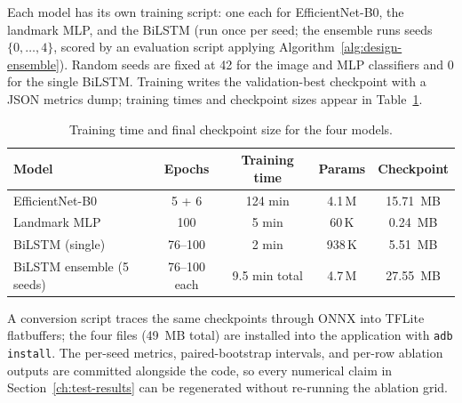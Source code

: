 Each model has its own training script: one each for EfficientNet-B0,
the landmark MLP, and the BiLSTM (run once per seed; the ensemble
runs seeds $\{0, \dots, 4\}$, scored by an evaluation script applying
Algorithm~\ref{alg:design-ensemble}). Random seeds are fixed at 42
for the image and MLP classifiers and 0 for the single BiLSTM.
Training writes the validation-best checkpoint with a JSON metrics
dump; training times and checkpoint sizes appear in
Table~\ref{tab:impl-training-summary}.

\begin{table}[!ht]
\centering
\caption{Training time and final checkpoint size for the four models.}
\label{tab:impl-training-summary}
\begin{tabular}{lcccc}
\toprule
\textbf{Model} & \textbf{Epochs} & \textbf{Training time} & \textbf{Params} & \textbf{Checkpoint} \\
\midrule
EfficientNet-B0          & 5 + 6   & 124 min  & 4.1\,M   & 15.71~MB \\
Landmark MLP             & 100     & 5 min    & 60\,K    & 0.24~MB \\
BiLSTM (single)          & 76--100 & 2 min    & 938\,K   & 5.51~MB \\
BiLSTM ensemble (5 seeds) & 76--100 each & 9.5 min total & 4.7\,M & 27.55~MB \\
\bottomrule
\end{tabular}
\end{table}

A conversion script traces the same checkpoints through ONNX into
TFLite flatbuffers; the four files (49~MB total) are installed into
the application with \texttt{adb install}. The per-seed
metrics, paired-bootstrap intervals, and per-row ablation outputs are
committed alongside the code, so every numerical claim in
Section~\ref{ch:test-results} can be regenerated without re-running
the ablation grid.
